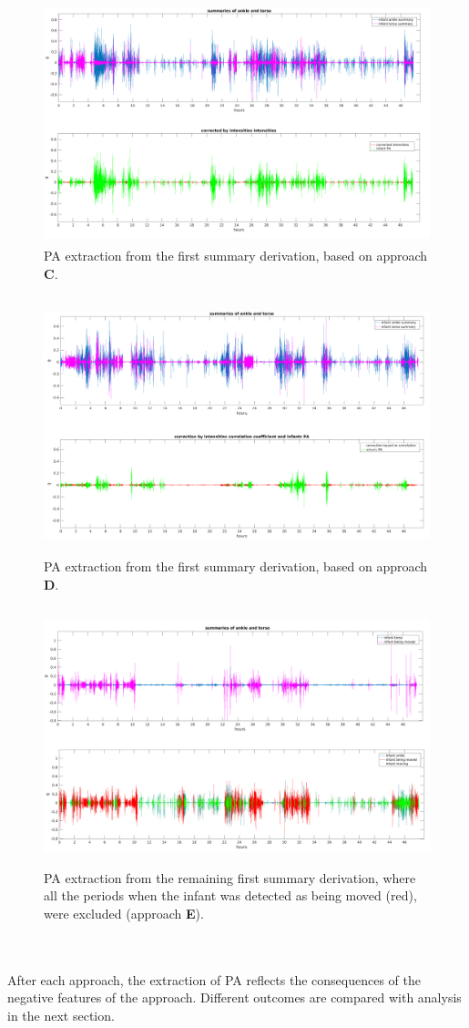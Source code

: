 \documentclass{article}
\begin{document}
{\begin{figure}[h]
\includegraphics[width=15cm, height=7cm]{CorrectedIntensitiesPA.png}
\caption{PA extraction from the first summary derivation, based on approach \textbf{C}.}
\end{figure}
\newpage
\begin{figure}[h!]
\includegraphics[width=15cm, height=7.5cm]{CorrectedCorrelationResultPA.png}
\caption{PA extraction from the first summary derivation, based on approach \textbf{D}.}
\end{figure}

\begin{figure}[h!]
\includegraphics[width=15cm, height=7.5cm]{approachEPA.png}
\caption{PA extraction from the remaining first summary derivation, where all the periods when the infant was detected as being moved (red), were excluded (approach \textbf{E}).}
\end{figure}
\\\\
After each approach, the extraction of PA reflects the consequences of the negative features of the approach. Different outcomes are compared with analysis in the next section.
}
\newpage
\end{document}

